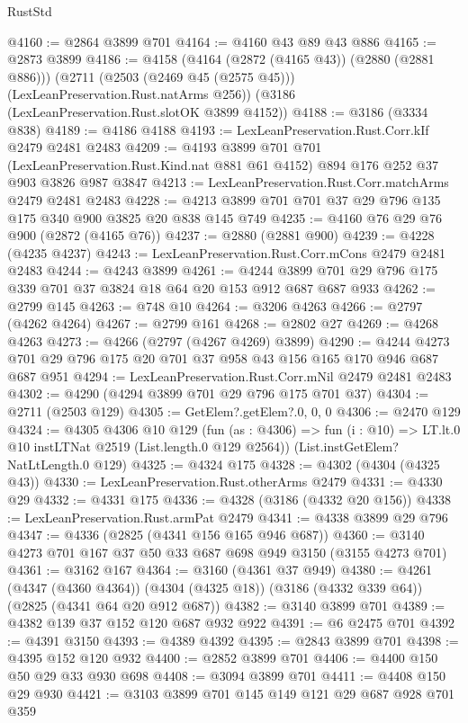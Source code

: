 \begin{lexlean}{RustStd}
\begin{coremodule}
@4160 := @2864 @3899 @701
@4164 := @4160 @43 @89 @43 @886
@4165 := @2873 @3899
@4186 := @4158
    (@4164 (@2872 (@4165 @43)) (@2880 (@2881 @886)))
    (@2711 (@2503 (@2469 @45 (@2575 @45))) (LexLeanPreservation.Rust.natArms @256))
    (@3186 (LexLeanPreservation.Rust.slotOK @3899 @4152))
@4188 := @3186 (@3334 @838)
@4189 := @4186 @4188
@4193 := LexLeanPreservation.Rust.Corr.kIf @2479 @2481 @2483
@4209 := @4193
    @3899
    @701
    @701
    (LexLeanPreservation.Rust.Kind.nat @881 @61 @4152)
    @894
    @176
    @252
    @37
    @903
    @3826
    @987
    @3847
@4213 := LexLeanPreservation.Rust.Corr.matchArms @2479 @2481 @2483
@4228 := @4213 @3899 @701 @701 @37 @29 @796 @135 @175 @340 @900 @3825 @20 @838 @145 @749
@4235 := @4160 @76 @29 @76 @900 (@2872 (@4165 @76))
@4237 := @2880 (@2881 @900)
@4239 := @4228 (@4235 @4237)
@4243 := LexLeanPreservation.Rust.Corr.mCons @2479 @2481 @2483
@4244 := @4243 @3899
@4261 := @4244 @3899 @701 @29 @796 @175 @339 @701 @37 @3824 @18 @64 @20 @153 @912 @687 @687 @933
@4262 := @2799 @145
@4263 := @748 @10
@4264 := @3206 @4263
@4266 := @2797 (@4262 @4264)
@4267 := @2799 @161
@4268 := @2802 @27
@4269 := @4268 @4263
@4273 := @4266 (@2797 (@4267 @4269) @3899)
@4290 := @4244 @4273 @701 @29 @796 @175 @20 @701 @37 @958 @43 @156 @165 @170 @946 @687 @687 @951
@4294 := LexLeanPreservation.Rust.Corr.mNil @2479 @2481 @2483
@4302 := @4290 (@4294 @3899 @701 @29 @796 @175 @701 @37)
@4304 := @2711 (@2503 @129)
@4305 := GetElem?.getElem?.{0, 0, 0}
@4306 := @2470 @129
@4324 := @4305
    @4306
    @10
    @129
    (fun (as : @4306) =>
    fun (i : @10) => LT.lt.{0} @10 instLTNat @2519 (List.length.{0} @129 @2564))
    (List.instGetElem?NatLtLength.{0} @129)
@4325 := @4324 @175
@4328 := @4302 (@4304 (@4325 @43))
@4330 := LexLeanPreservation.Rust.otherArms @2479
@4331 := @4330 @29
@4332 := @4331 @175
@4336 := @4328 (@3186 (@4332 @20 @156))
@4338 := LexLeanPreservation.Rust.armPat @2479
@4341 := @4338 @3899 @29 @796
@4347 := @4336 (@2825 (@4341 @156 @165 @946 @687))
@4360 := @3140 @4273 @701 @167 @37 @50 @33 @687 @698 @949 @3150 (@3155 @4273 @701)
@4361 := @3162 @167
@4364 := @3160 (@4361 @37 @949)
@4380 := @4261
    (@4347 (@4360 @4364))
    (@4304 (@4325 @18))
    (@3186 (@4332 @339 @64))
    (@2825 (@4341 @64 @20 @912 @687))
@4382 := @3140 @3899 @701
@4389 := @4382 @139 @37 @152 @120 @687 @932 @922
@4391 := @6 @2475 @701
@4392 := @4391 @3150
@4393 := @4389 @4392
@4395 := @2843 @3899 @701
@4398 := @4395 @152 @120 @932
@4400 := @2852 @3899 @701
@4406 := @4400 @150 @50 @29 @33 @930 @698
@4408 := @3094 @3899 @701
@4411 := @4408 @150 @29 @930
@4421 := @3103 @3899 @701 @145 @149 @121 @29 @687 @928 @701 @359

\end{coremodule}
\end{lexlean}
